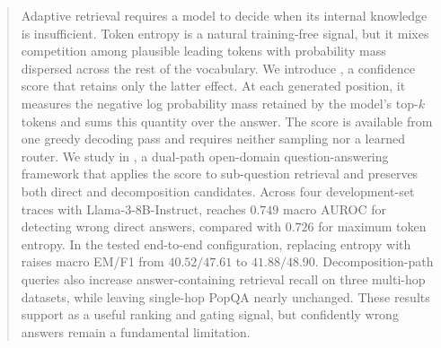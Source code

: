 \begin{abstract}
Adaptive retrieval requires a model to decide when its internal knowledge is
insufficient. Token entropy is a natural training-free signal, but it mixes
competition among plausible leading tokens with probability mass dispersed
across the rest of the vocabulary. We introduce \tailleak{}, a confidence score
that retains only the latter effect. At each generated position, it measures
the negative log probability mass retained by the model's top-\(k\) tokens and
sums this quantity over the answer. The score is available from one greedy
decoding pass and requires neither sampling nor a learned router. We study
\tailleak{} in \method{}, a dual-path open-domain question-answering framework
that applies the score to sub-question retrieval and preserves both direct and
decomposition candidates. Across four development-set traces with
Llama-3-8B-Instruct, \tailleak{} reaches \(0.749\) macro AUROC for detecting
wrong direct answers, compared with \(0.726\) for maximum token entropy. In the
tested end-to-end configuration, replacing entropy with \tailleak{} raises
macro EM/F1 from \(40.52/47.61\) to \(41.88/48.90\). Decomposition-path queries
also increase answer-containing retrieval recall on three multi-hop datasets,
while leaving single-hop PopQA nearly unchanged. These results support
\tailleak{} as a useful ranking and gating signal, but confidently wrong
answers remain a fundamental limitation.
\end{abstract}
